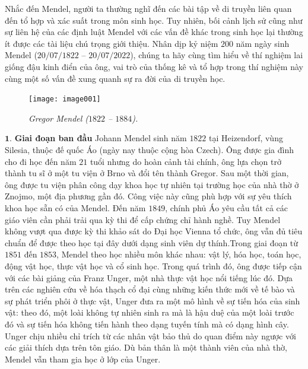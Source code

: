 \begin{multicols}{2}
	Nhắc đến Mendel, người ta thường nghĩ đến các bài tập về di truyền liên quan đến tổ hợp và xác suất trong môn sinh học. Tuy nhiên, bối cảnh lịch sử cũng như sự liên hệ của các định luật Mendel với các vấn đề khác trong sinh học lại thường ít được các tài liệu chú trọng giới thiệu. Nhân dịp kỷ niệm $200$ năm ngày sinh Mendel ($20/07/1822$ -- $20/07/2022$), chúng ta hãy cùng tìm hiểu về thí nghiệm lai giống đậu kinh điển của ông, vai trò của thống kê và tổ hợp trong thí nghiệm này cùng một số vấn đề xung quanh sự ra đời của di truyền học.
	\begin{figure}[H]
		\centering
		\vspace*{-5pt}
		\captionsetup{labelformat= empty, justification=centering}
		\texttt{[image: image001]}
		\caption{\small\textit{\color{timhieukhoahoc}Gregor Mendel ($1822$ -- $1884$).}}
		\vspace*{-5pt}
	\end{figure}
	$\pmb{1.}$ \textbf{\color{timhieukhoahoc}Giai đoạn ban đầu}
	\vskip 0.1cm
	Johann Mendel sinh năm $1822$ tại Heizendorf, vùng Silesia, thuộc đế quốc Áo (ngày nay thuộc cộng hòa Czech). Ông được gia đình cho đi học đến năm $21$ tuổi nhưng do hoàn cảnh tài chính, ông lựa chọn trở thành tu sĩ ở một tu viện ở Brno và đổi tên thành Gregor.
	\vskip 0.1cm
	Sau một thời gian, ông được tu viện phân công dạy khoa học tự nhiên tại trường học của nhà thờ ở Znojmo, một địa phương gần đó. Công việc này cũng phù hợp với sự yêu thích khoa học sẵn có của Mendel. 
	\vskip 0.1cm
	Đến năm $1849$, chính phủ Áo yêu cầu tất cả các giáo viên cần phải trải qua kỳ thi để cấp chứng chỉ hành nghề. Tuy Mendel không vượt qua được kỳ thi khảo sát do Đại học Vienna tổ chức, ông vẫn đủ tiêu chuẩn để được theo học tại đây dưới dạng sinh viên dự thính.Trong giai đoạn từ $1851$ đến $1853$, Mendel theo học nhiều môn khác nhau: vật lý, hóa học, toán học, động vật học, thực vật học và cổ sinh học. Trong quá trình đó, ông được tiếp cận với các bài giảng của Franz Unger, một nhà thực vật học nổi tiếng lúc đó. Dựa trên các nghiên cứu về hóa thạch cổ đại cùng những kiến thức mới về tế bào và sự phát triển phôi ở thực vật, Unger đưa ra một mô hình về sự tiến hóa của sinh vật: theo đó, một loài không tự nhiên sinh ra mà là hậu duệ của một loài trước đó và sự tiến hóa không tiến hành theo dạng tuyến tính mà có dạng hình cây. Unger chịu nhiều chỉ trích từ các nhân vật bảo thủ do quan điểm này ngược với các giải thích dựa trên tôn giáo. Dù bản thân là một thành viên của nhà thờ, Mendel vẫn tham gia học ở lớp của Unger.

\end{multicols}

